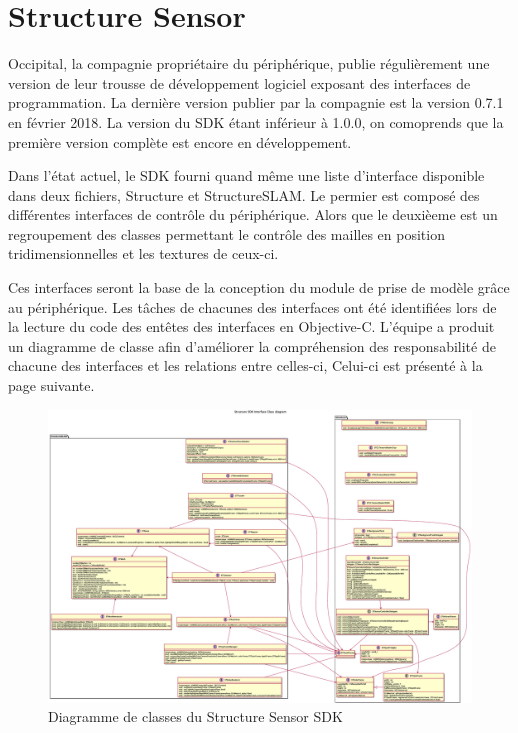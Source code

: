 \documentclass[letterpaper,twoside,12pt,french]{report}
\begin{document}
\section*{Structure Sensor}
Occipital, la compagnie propriétaire du périphérique, publie régulièrement une version de leur
trousse de développement logiciel exposant des interfaces de programmation. La dernière version
publier par la compagnie est la version 0.7.1 en février 2018. \citep*{occipitalsdk} La version du
SDK étant inférieur à 1.0.0, on comoprends que la première version complète est encore en
développement.
\par
Dans l'état actuel, le SDK fourni quand même une liste d'interface disponible dans deux fichiers,
Structure et StructureSLAM. Le permier est composé des différentes interfaces de contrôle du
périphérique. Alors que le deuxièeme est un regroupement des classes permettant le contrôle des
mailles en position tridimensionnelles et les textures de ceux-ci.
\par
Ces interfaces seront la base de la conception du module de prise de modèle grâce au périphérique.
Les tâches de chacunes des interfaces ont été identifiées lors de la lecture du code des entêtes
des interfaces en Objective-C. L'équipe a produit un diagramme de classe afin d'améliorer la
compréhension des responsabilité de chacune des interfaces et les relations entre celles-ci,
Celui-ci est présenté à la page suivante.

\begin{figure}[H]
    \includegraphics[width=\textwidth]{StructureClassDiagram.eps}
\centering
    \caption{Diagramme de classes du Structure Sensor SDK}
\end{figure}
\end{document}
